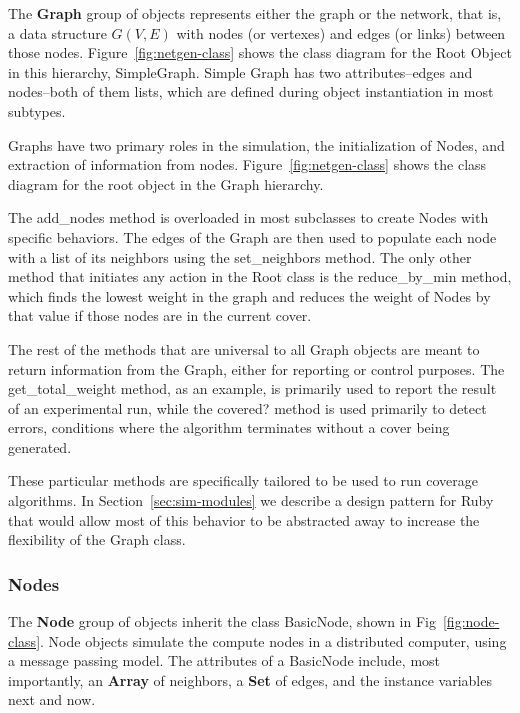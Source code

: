 The {\bfseries Graph} group of objects represents either the graph or the network, that is, a data structure $G(V,E)$ with nodes (or vertexes) and edges (or links) between those nodes. Figure~\ref{fig:netgen-class} shows the class diagram for the Root Object in this hierarchy, {\ttfamily SimpleGraph}. Simple Graph has two attributes--{\ttfamily edges} and {\ttfamily nodes}--both of them lists, which are defined during object instantiation in most subtypes. 



Graphs have two primary roles in the simulation, the initialization of Nodes, and extraction of information from nodes. Figure~\ref{fig:netgen-class} shows the class diagram for the root object in the Graph hierarchy.

The {\ttfamily add\_nodes} method is overloaded in most subclasses to create Nodes with specific behaviors. The edges of the Graph are then used to populate each node with a list of its neighbors using the {\ttfamily set\_neighbors} method. The only other method that initiates any action in the Root class is the {\ttfamily reduce\_by\_min} method, which finds the lowest weight in the graph and reduces the weight of Nodes by that value if those nodes are in the current cover.

The rest of the methods that are universal to all Graph objects are meant to return information from the Graph, either for reporting or control purposes. The {\ttfamily get\_total\_weight} method, as an example, is primarily used to report the result of an experimental run, while the {\ttfamily covered?} method is used primarily to detect errors, conditions where the algorithm terminates without a cover being generated.

These particular methods are specifically tailored to be used to run coverage algorithms. In Section~\ref{sec:sim-modules} we describe a design pattern for Ruby that would allow most of this behavior to be abstracted away to increase the flexibility of the Graph class.

\subsubsection{Nodes}
\label{sec:sim-objects-nodes}
The {\bfseries Node} group of objects inherit the class {\ttfamily BasicNode}, shown in Fig~\ref{fig:node-class}. Node objects simulate the compute nodes in a distributed computer, using a message passing model. The attributes of a {\ttfamily BasicNode} include, most importantly, an {\bfseries Array} of neighbors, a {\bfseries Set} of edges, and the instance variables {\ttfamily next} and {\ttfamily now}.

